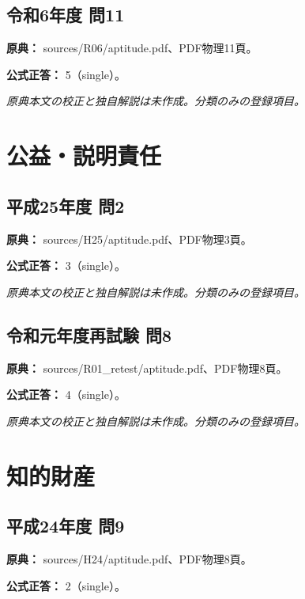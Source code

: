 \subsection{令和6年度 問11}
\label{q:r06-reg-apt-11}

\noindent\textbf{原典：} sources/R06/aptitude.pdf、PDF物理11頁。

\textbf{公式正答：} 5（single）。

\par\textit{原典本文の校正と独自解説は未作成。分類のみの登録項目。}

\section{公益・説明責任}

\subsection{平成25年度 問2}
\label{q:h25-reg-apt-02}

\noindent\textbf{原典：} sources/H25/aptitude.pdf、PDF物理3頁。

\textbf{公式正答：} 3（single）。

\par\textit{原典本文の校正と独自解説は未作成。分類のみの登録項目。}

\subsection{令和元年度再試験 問8}
\label{q:r01-ret-apt-08}

\noindent\textbf{原典：} sources/R01\_retest/aptitude.pdf、PDF物理8頁。

\textbf{公式正答：} 4（single）。

\par\textit{原典本文の校正と独自解説は未作成。分類のみの登録項目。}

\section{知的財産}

\subsection{平成24年度 問9}
\label{q:h24-reg-apt-09}

\noindent\textbf{原典：} sources/H24/aptitude.pdf、PDF物理8頁。

\textbf{公式正答：} 2（single）。

